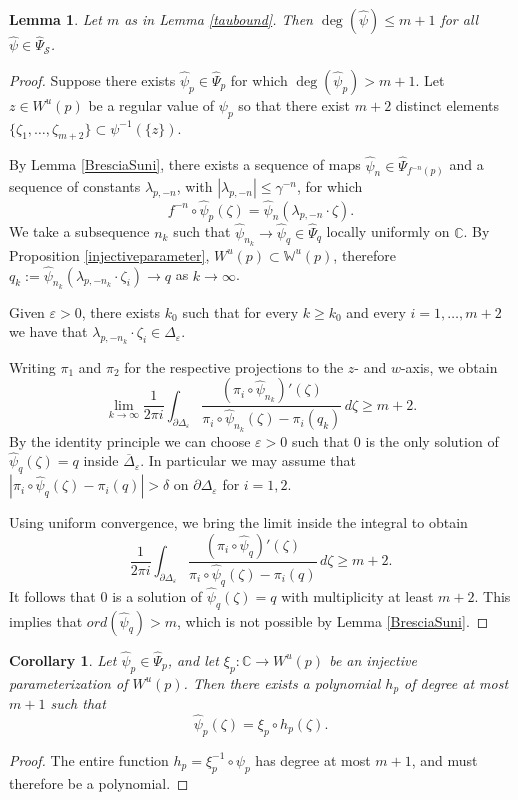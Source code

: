 \documentclass[10pt,a4paper]{article}
\newtheorem{corollary}[theorem]{Corollary}
\newtheorem{lemma}[theorem]{Lemma}
\begin{document}
\begin{lemma}
\label{degbound}
Let $m$ as in Lemma \ref{taubound}. Then $\deg(\widehat\psi)\leq m+1$ for all $\widehat\psi\in\widehat\Psi_\mathcal S$.
\end{lemma}
\begin{proof}
Suppose there exists $\widehat\psi_p\in\widehat\Psi_p$ for which $\deg(\widehat\psi_p)>m+1$. Let $z\in W^u(p)$ be a regular value of $\psi_p$ so that there exist $m+2$ distinct elements $\{\zeta_1,\dots,\zeta_{m+2}\}\subset\psi^{-1}(\{z\})$.

By Lemma \ref{BresciaSuni}, there exists a sequence of maps $\widehat\psi_n\in\widehat\Psi_{f^{-n}(p)}$ and a sequence of constants $\lambda_{p,-n}$, with $|\lambda_{p,-n}|\leq \gamma^{-n}$, for which
\[
f^{-n}\circ\widehat\psi_p(\zeta)=\widehat\psi_n(\lambda_{p,-n}\cdot \zeta).
\]
We take a subsequence $n_k$ such that $\widehat\psi_{n_k}\to\widehat\psi_q\in\widehat\Psi_q$ locally uniformly on $\mathbb C$. By Proposition \ref{injectiveparameter}, $W^u(p)\subset\mathbb W^u(p)$, therefore $q_k:=\widehat\psi_{n_k}\left(\lambda_{p,-n_k}\cdot \zeta_i\right)\to q$ as $k\to\infty$.

Given $\varepsilon>0$, there exists $k_0$ such that for every $k\geq k_0$ and every $i=1,\ldots , m+2$ we have that $\lambda_{p,-n_k}\cdot\zeta_i\in\Delta_{\varepsilon}$.

Writing $\pi_1$ and $\pi_2$ for the respective projections to the $z$- and $w$-axis, we obtain
\[
\lim_{k\to\infty}\frac{1}{2\pi i}\int_{\partial \Delta_\varepsilon}\frac{(\pi_i\circ \widehat\psi_{n_k})'(\zeta)}{\pi_i\circ\widehat\psi_{n_k}(\zeta)-\pi_i(q_{k})}\,d\zeta\geq m+2.
\]
By the identity principle we can choose $\varepsilon>0$ such that $0$ is the only solution of $\widehat\psi_q(\zeta)=q$ inside $\overline{\Delta}_\varepsilon$. In particular we may assume that $|\pi_i\circ\widehat\psi_q(\zeta)-\pi_i(q)|>\delta$ on $\partial \Delta_\varepsilon$ for $i = 1, 2$.

Using uniform convergence, we bring the limit inside the integral to obtain
\[
\frac{1}{2\pi i}\int_{\partial \Delta_\varepsilon}\frac{(\pi_i\circ \widehat\psi_{q})'(\zeta)}{\pi_i\circ\widehat\psi_{q}(\zeta)-\pi_i(q)}\,d\zeta\geq m+2.
\]
It follows that $0$ is a solution of $\widehat\psi_q(\zeta) = q$ with multiplicity at least $m+2$. This implies that $ord(\widehat\psi_q)>m$, which is not possible by Lemma \ref{BresciaSuni}.
\end{proof}

\begin{corollary}
\label{polynomialconnection}
Let $\widehat\psi_p\in\widehat\Psi_p$, and let $\xi_p:\mathbb C\rightarrow W^u(p)$ be an injective parameterization of $W^u(p)$. Then there exists a polynomial $h_p$ of degree at most $m+1$ such that
\[
\widehat\psi_p(\zeta)=\xi_p\circ h_p(\zeta).
\]
\end{corollary}
\begin{proof}
The entire function $h_p=\xi^{-1}_p\circ\psi_p$ has degree at most $m+1$, and must therefore be a polynomial.
\end{proof}
\end{document}
